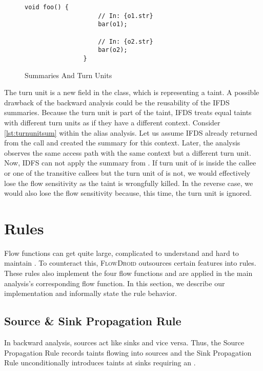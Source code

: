 \documentclass[../draft.tex]{subfiles}
\begin{document}
    \begin{figure}[tbp]
        \centering
        \begin{adjustbox}{max width=\columnwidth}
            \begin{lstlisting}[gobble=16]
                void foo() {
                    // In: {o1.str}
                    bar(o1);

                    // In: {o2.str}
                    bar(o2);
                }
            \end{lstlisting}
        \end{adjustbox}
        \caption{Summaries And Turn Units}
        \label{lst:turnunitsum}
    \end{figure}

    The turn unit is a new field in the  class, which is representing a taint. 
    A possible drawback of the backward analysis could be the reusability of the IFDS summaries. 
    Because the turn unit is part of the taint, IFDS treats equal taints with different turn units as if they have a different context. 
    Consider \autoref{lst:turnunitsum} within the alias analysis.
    Let us assume IFDS already returned from the call  and created the summary for this context.
    Later, the analysis observes the same access path with the same context but a different turn unit.
    Now, IDFS can not apply the summary from .
    If turn unit of  is inside the callee or one of the transitive callees but the turn unit of  is not, we would effectively lose the flow sensitivity as the taint is wrongfully killed.
    In the reverse case, we would also lose the flow sensitivity because, this time, the turn unit is ignored.

    \section{Rules}\label{s:rules}
    Flow functions can get quite large, complicated to understand and hard to maintain \cite{Lerch2015}. 
    To counteract this, \textsc{FlowDroid} outsources certain features into rules. 
    These rules also implement the four flow functions and are applied in the main analysis's corresponding flow function.
    In this section, we describe our implementation and informally state the rule behavior.

    \subsection{Source \& Sink Propagation Rule}\label{s:sourcerule}
    In backward analysis, sources act like sinks and vice versa. 
    Thus, the Source Propagation Rule records taints flowing into sources and the Sink Propagation Rule unconditionally introduces taints at sinks requiring an .
\end{document}
